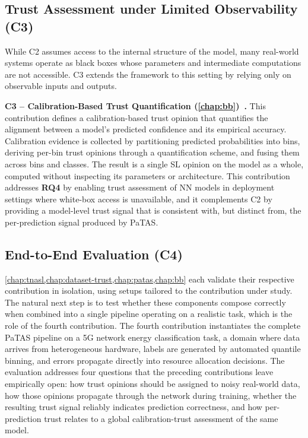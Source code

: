 \subsection{Trust Assessment under Limited Observability (C3)}

While C2 assumes access to the internal structure of the model, many real-world systems operate as black boxes whose parameters and intermediate computations are not accessible. C3 extends the framework to this setting by relying only on observable inputs and outputs.

\textbf{C3 -- Calibration-Based Trust Quantification (\cref{chap:bb})~\cite{11124121}.} This contribution defines a calibration-based trust opinion that quantifies the alignment between a model's predicted confidence and its empirical accuracy. Calibration evidence is collected by partitioning predicted probabilities into bins, deriving per-bin trust opinions through a quantification scheme, and fusing them across bins and classes. The result is a single \ac{SL} opinion on the model as a whole, computed without inspecting its parameters or architecture. This contribution addresses \textbf{\ac{RQ}4} by enabling trust assessment of \ac{NN} models in deployment settings where white-box access is unavailable, and it complements C2 by providing a model-level trust signal that is consistent with, but distinct from, the per-prediction signal produced by \ac{PaTAS}.

\subsection{End-to-End Evaluation (C4)}
\cref{chap:tnasl,chap:dataset-trust,chap:patas,chap:bb} each validate their respective contribution in isolation, using setups tailored to the contribution under study. The natural next step is to test whether these components compose correctly when combined into a single pipeline operating on a realistic task, which is the role of the fourth contribution. The fourth contribution instantiates the complete \ac{PaTAS} pipeline on a 5G network energy classification task, a domain where data arrives from heterogeneous hardware, labels are generated by automated quantile binning, and errors propagate directly into resource allocation decisions. The evaluation addresses four questions that the preceding contributions leave empirically open: how trust opinions should be assigned to noisy real-world data, how those opinions propagate through the network during training, whether the resulting trust signal reliably indicates prediction correctness, and how per-prediction trust relates to a global calibration-trust assessment of the same model.


